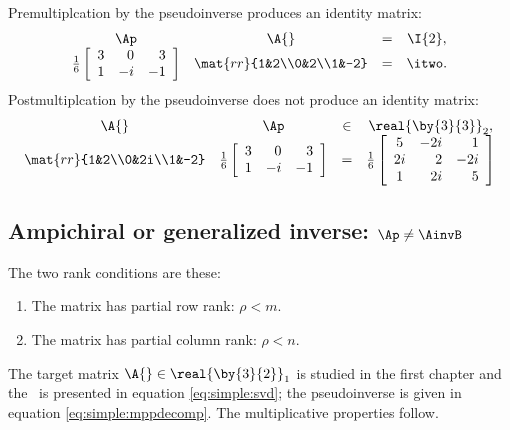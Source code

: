 Premultiplcation by the pseudoinverse produces an identity matrix:
\begin{equation*}
  \begin{array}{cccc}
  \Ap&\A{}&=&\I{2},\\
  \frac{1}{6}\left[
\begin{array}{crr}
 3 &  0 & 3 \\
 1 & -i & -1
\end{array}
\right] &
  \mat{rr}{1&2\\0&2\\1&-2} & = &
  \itwo.
  \end{array}
\end{equation*}
Postmultiplcation by the pseudoinverse does not produce an identity matrix:
\begin{equation*}
  \begin{array}{cccc}
  \A{}&\Ap&\in&\real{\by{3}{3}}_{2},\\
  \mat{rr}{1&2\\0&2i\\1&-2} &
  \frac{1}{6}\left[
\begin{array}{crr}
 3 &  0 & 3 \\
 1 & -i & -1
\end{array}
\right]
   & = &
  \frac{1}{6}
\left[
\begin{array}{crr}
 5 & -2 i & 1 \\
 2 i & 2 & -2 i \\
 1 & 2 i & 5
\end{array}
\right]
  \end{array}
\end{equation*}

\subsection{Ampichiral or generalized inverse: $\Ap\ne\AinvB$}
The two rank conditions are these:
\begin{enumerate}
\item The matrix has partial row rank: $\rho < m$.
\item The matrix has partial column rank: $\rho < n$.
\end{enumerate}

The target matrix $\A{}\in\real{\by{3}{2}}_{1}$ is studied in the first chapter and the \svdl \ is presented in equation \eqref{eq:simple:svd}; the pseudoinverse is given in equation \eqref{eq:simple:mppdecomp}. The multiplicative properties follow.

